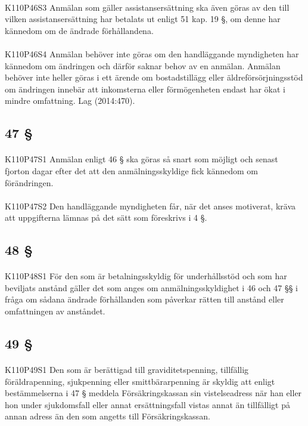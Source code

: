 \documentclass[a4paper,notitlepage,openany,10pt]{book}
\begin{document}
\paragraph*{}
{\tiny K110P46S3}
Anmälan som gäller assistansersättning ska även göras av den till vilken assistansersättning har betalats ut enligt 51 kap. 19 §, om denne har kännedom om de ändrade förhållandena.
\paragraph*{}
{\tiny K110P46S4}
Anmälan behöver inte göras om den handläggande myndigheten har kännedom om ändringen och därför saknar behov av en anmälan. Anmälan behöver inte heller göras i ett ärende om bostadstillägg eller äldreförsörjningsstöd om ändringen innebär att inkomsterna eller förmögenheten endast har ökat i mindre omfattning.
Lag (2014:470).
\subsection*{47 §}
\paragraph*{}
{\tiny K110P47S1}
Anmälan enligt 46 § ska göras så snart som möjligt och senast fjorton dagar efter det att den anmälningsskyldige fick kännedom om förändringen.
\paragraph*{}
{\tiny K110P47S2}
Den handläggande myndigheten får, när det anses motiverat, kräva att uppgifterna lämnas på det sätt som föreskrivs i 4 §.
\subsection*{48 §}
\paragraph*{}
{\tiny K110P48S1}
För den som är betalningsskyldig för underhållsstöd och som har beviljats anstånd gäller det som anges om anmälningsskyldighet i 46 och 47 §§ i fråga om sådana ändrade förhållanden som påverkar rätten till anstånd eller omfattningen av anståndet.
\subsection*{49 §}
\paragraph*{}
{\tiny K110P49S1}
Den som är berättigad till graviditetspenning, tillfällig föräldrapenning, sjukpenning eller smittbärarpenning är skyldig att enligt bestämmelserna i 47 § meddela Försäkringskassan sin vistelseadress när han eller hon under sjukdomsfall eller annat ersättningsfall vistas annat än tillfälligt på annan adress än den som angetts till Försäkringskassan.
\end{document}
